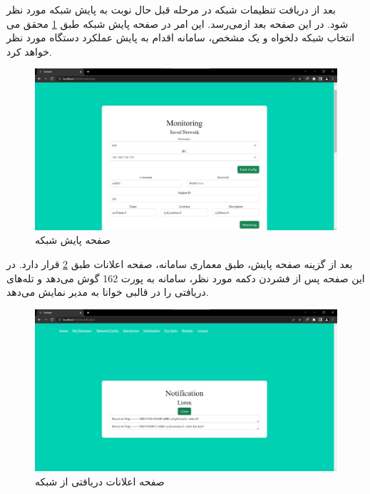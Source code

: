 بعد از دریافت تنظیمات شبکه در مرحله قبل حال نوبت به پایش شبکه مورد نظر می‌رسد. این امر در صفحه پایش شبکه طبق \cref{fig.18} محقق می‌‎شود. در این صفحه بعد از انتخاب شبکه دلخواه و یک  مشخص، سامانه اقدام به پایش عملکرد دستگاه مورد نظر خواهد کرد.


\begin{figure}[!h]
    \centering\includegraphics[scale=.38]{./monitoring}
    \caption{صفحه پایش شبکه}\label{fig.18}
\end{figure}



بعد از گزینه صفحه پایش، طبق معماری سامانه، صفحه اعلانات طبق \cref{fig.19} قرار دارد. در این صفحه پس از فشردن دکمه مورد نظر، سامانه به پورت 162 گوش می‌دهد و تله‌های دریافتی را در قالبی خوانا به مدیر نمایش می‌دهد.

\begin{figure}[!h]
    \centering\includegraphics[scale=.38]{./notification}
    \caption{صفحه اعلانات دریافتی از شبکه}\label{fig.19}
\end{figure}

